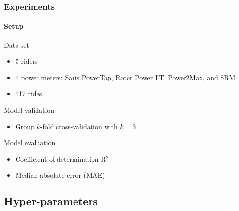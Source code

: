 \documentclass{beamer}
\begin{document}
\begin{frame}
  \frametitle{Experiments}
  \framesubtitle{Setup}
  \begin{block}{\small Data set}
    \begin{itemize}\small
    \item 5 riders
    \item 4 power meters: Saris PowerTap, Rotor Power LT, Power2Max, and SRM
    \item 417 rides
    \end{itemize}
  \end{block}
  \begin{block}{\small Model validation}
    \begin{itemize}\small
    \item Group $k$-fold cross-validation with $k=3$
    \end{itemize}
  \end{block}
  \begin{block}{\small Model evaluation}
    \begin{itemize}\small
    \item Coefficient of determination R$^2$
    \item Median absolute error (MAE)
    \end{itemize}
  \end{block}
\end{frame}

\subsection{Hyper-parameters}
\end{document}
